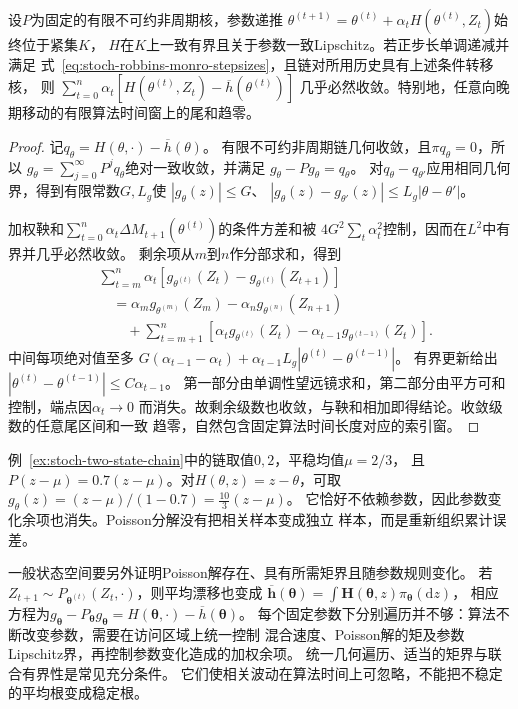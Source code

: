\begin{lemma}[固定有限链的加权Poisson分解]
  \label{lem:stoch-finite-chain-poisson-sum}
  设$P$为固定的有限不可约非周期核，参数递推
  $\theta^{(t+1)}=\theta^{(t)}+\alpha_tH(\theta^{(t)},Z_t)$始终位于紧集$K$，
  $H$在$K$上一致有界且关于参数一致Lipschitz。若正步长单调递减并满足
  式~\eqref{eq:stoch-robbins-monro-stepsizes}，且链对所用历史具有上述条件转移核，
  则
  $\sum_{t=0}^n\alpha_t[H(\theta^{(t)},Z_t)-\overline h(\theta^{(t)})]$
  几乎必然收敛。特别地，任意向晚期移动的有限算法时间窗上的尾和趋零。
\end{lemma}
\begin{proof}
  记$q_\theta=H(\theta,\cdot)-\overline h(\theta)$。
  有限不可约非周期链几何收敛，且$\pi q_\theta=0$，所以
  $g_\theta=\sum_{j=0}^\infty P^jq_\theta$绝对一致收敛，并满足
  $g_\theta-Pg_\theta=q_\theta$。
  对$q_\theta-q_{\theta'}$应用相同几何界，得到有限常数$G,L_g$使
  $|g_\theta(z)|\leq G$、
  $|g_\theta(z)-g_{\theta'}(z)|\leq L_g|\theta-\theta'|$。

  加权鞅和$\sum_{t=0}^n\alpha_t\Delta M_{t+1}(\theta^{(t)})$的条件方差和被
  $4G^2\sum_t\alpha_t^2$控制，因而在$L^2$中有界并几乎必然收敛。
  剩余项从$m$到$n$作分部求和，得到
  \begin{align*}
    &\sum_{t=m}^n\alpha_t
       [g_{\theta^{(t)}}(Z_t)-g_{\theta^{(t)}}(Z_{t+1})]\\
    &\quad=\alpha_mg_{\theta^{(m)}}(Z_m)
       -\alpha_ng_{\theta^{(n)}}(Z_{n+1})\\
    &\qquad+\sum_{t=m+1}^n
       [\alpha_tg_{\theta^{(t)}}(Z_t)
        -\alpha_{t-1}g_{\theta^{(t-1)}}(Z_t)].
  \end{align*}
  中间每项绝对值至多
  $G(\alpha_{t-1}-\alpha_t)
    +\alpha_{t-1}L_g|\theta^{(t)}-\theta^{(t-1)}|$。
  有界更新给出$|\theta^{(t)}-\theta^{(t-1)}|\leq C\alpha_{t-1}$。
  第一部分由单调性望远镜求和，第二部分由平方可和控制，端点因$\alpha_t\to0$
  而消失。故剩余级数也收敛，与鞅和相加即得结论。收敛级数的任意尾区间和一致
  趋零，自然包含固定算法时间长度对应的索引窗。
\end{proof}

例~\ref{ex:stoch-two-state-chain}中的链取值$0,2$，平稳均值$\mu=2/3$，
且$P(z-\mu)=0.7(z-\mu)$。对$H(\theta,z)=z-\theta$，可取
$g_\theta(z)=(z-\mu)/(1-0.7)=\frac{10}{3}(z-\mu)$。
它恰好不依赖参数，因此参数变化余项也消失。Poisson分解没有把相关样本变成独立
样本，而是重新组织累计误差。

一般状态空间要另外证明Poisson解存在、具有所需矩界且随参数规则变化。
若$Z_{t+1}\sim P_{\bm\theta^{(t)}}(Z_t,\cdot)$，则平均漂移也变成
$\overline{\bm h}(\bm\theta)=\int\bm H(\bm\theta,z)\pi_{\bm\theta}(\mathrm dz)$，
相应方程为$g_{\bm\theta}-P_{\bm\theta}g_{\bm\theta}
=H(\bm\theta,\cdot)-\overline h(\bm\theta)$。
每个固定参数下分别遍历并不够：算法不断改变参数，需要在访问区域上统一控制
混合速度、Poisson解的矩及参数Lipschitz界，再控制参数变化造成的加权余项。
统一几何遍历、适当的矩界与联合有界性是常见充分条件。
它们使相关波动在算法时间上可忽略，不能把不稳定的平均根变成稳定根。

